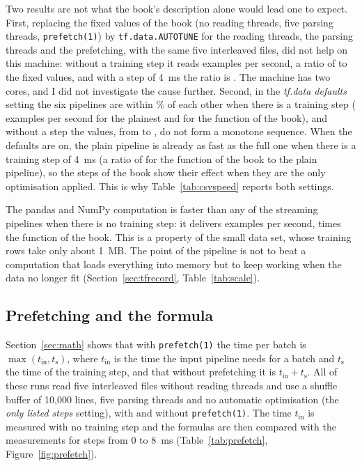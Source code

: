 Two results are not what the book's description alone would lead one to expect. First, replacing the fixed values of the book (no reading threads, five parsing threads, \texttt{prefetch(1)}) by \texttt{tf.data.AUTOTUNE} for the reading threads, the parsing threads and the prefetching, with the same five interleaved files, did not help on this machine: without a training step it reads  examples per second, a ratio of  to the fixed values, and with a step of 4~ms the ratio is . The machine has two cores, and I did not investigate the cause further. Second, in the \emph{tf.data defaults} setting the six pipelines are within \% of each other when there is a training step ( examples per second for the plainest and  for the function of the book), and without a step the values, from  to , do not form a monotone sequence. When the defaults are on, the plain pipeline is already as fast as the full one when there is a training step of 4~ms (a ratio of  for the function of the book to the plain pipeline), so the steps of the book show their effect when they are the only optimisation applied. This is why Table~\ref{tab:csvspeed} reports both settings.

The pandas and NumPy computation is faster than any of the streaming pipelines when there is no training step: it delivers  examples per second,  times the function of the book. This is a property of the small data set, whose training rows take only about 1~MB. The point of the pipeline is not to beat a computation that loads everything into memory but to keep working when the data no longer fit (Section~\ref{sec:tfrecord}, Table~\ref{tab:scale}).

\subsection{Prefetching and the formula}

Section~\ref{sec:math} shows that with \texttt{prefetch(1)} the time per batch is $\max(t_{\mathrm{in}}, t_{\mathrm{s}})$, where $t_{\mathrm{in}}$ is the time the input pipeline needs for a batch and $t_{\mathrm{s}}$ the time of the training step, and that without prefetching it is $t_{\mathrm{in}} + t_{\mathrm{s}}$. All of these runs read five interleaved files without reading threads and use a shuffle buffer of 10,000 lines, five parsing threads and no automatic optimisation (the \emph{only listed steps} setting), with and without \texttt{prefetch(1)}. The time $t_{\mathrm{in}}$ is measured with no training step and the formulas are then compared with the measurements for steps from 0 to 8~ms (Table~\ref{tab:prefetch}, Figure~\ref{fig:prefetch}).

